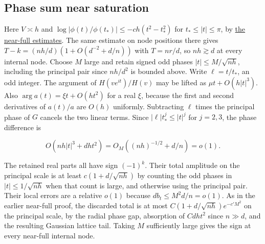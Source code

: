 \subsection{Phase sum near saturation}

Here $V\asymp h$ and $\log|\phi(t)/\phi(t_*)|\le-ch(t^2-t_*^2)$ for $t_*\le |t|\le\pi$, by \href{https://github.com/ProgramComputer/open-math-research/blob/4fb624ba937a8eecc1361a6066185cd81ab7b172/topics/balanced-arrays/quadratic/near-full-all-angular-signs.md}{the near-full estimates}. The same estimate on node positions there gives $T-k=(nh/d)(1+O(d^{-2}+d/n))$ with $T=nr/d$, so $nh\gtrsim d$ at every internal node. Choose $M$ large and retain signed odd phases $|t|\le M/\sqrt{nh}$, including the principal pair since $nh/d^2$ is bounded above. Write $\ell=t/t_*$, an odd integer. The argument of $H(ve^{it})/H(v)$ may be lifted as $\mu t+O(h|t|^3)$. Also $\arg a(t)=\xi t+O(ht^2)$ for a real $\xi$, because the first and second derivatives of $a(t)/a$ are $O(h)$ uniformly. Subtracting $\ell$ times the principal phase of $G$ cancels the two linear terms. Since $|\ell|t_*^j\le |t|^j$ for $j=2,3$, the phase difference is

\begin{equation*}
O(nh|t|^3+dh t^2)=O_M((nh)^{-1/2}+d/n)=o(1).
\end{equation*}

The retained real parts all have sign $(-1)^k$. Their total amplitude on the principal scale is at least $c(1+d/\sqrt{nh})$ by counting the odd phases in $|t|\le1/\sqrt{nh}$ when that count is large, and otherwise using the principal pair. Their local errors are a relative $o(1)$ because $db_t\le M^2d/n=o(1)$. As in the earlier near-full proof, the discarded total is at most $C(1+d/\sqrt{nh})e^{-c'M^2}$ on the principal scale, by the radial phase gap, absorption of $Cdh t^2$ since $n\gg d$, and the resulting Gaussian lattice tail. Taking $M$ sufficiently large gives the sign at every near-full internal node.
